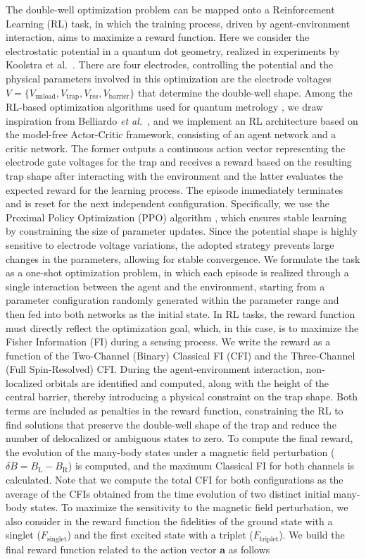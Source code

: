 \documentclass[fleqn,10pt]{wlscirep}
\begin{document}
The double-well optimization problem can be mapped onto a Reinforcement Learning (RL) task, in which the training process, driven by agent-environment interaction, aims to maximize a reward function. Here we consider the electrostatic potential in a quantum dot geometry, realized in experiments by Koolstra et al.~\cite{koolstra2026strong}. There are four electrodes, controlling the potential and the physical parameters involved in this optimization are the electrode voltages $V=\{V_\mathrm{unload}, V_\mathrm{trap}, V_\mathrm{res}, V_\mathrm{barrier}\}$ that determine the double-well shape. Among the RL-based optimization algorithms used for quantum metrology \cite{bukov2026reinforcement}, we draw inspiration from  Belliardo \textit{et al.}~\cite{belliardo2024model}, and we implement an RL architecture based on the model-free Actor-Critic framework, consisting of an agent network and a critic network.  The former outputs a continuous action vector representing the electrode gate voltages for the trap and receives a reward based on the resulting trap shape after interacting with the environment and the latter evaluates the expected reward for the learning process. The episode immediately terminates and is reset for the next independent configuration. Specifically, we use the Proximal Policy Optimization (PPO) algorithm \cite{schulman2017proximal}, which ensures stable learning by constraining the size of parameter updates. Since the potential shape is highly sensitive to electrode voltage variations, the adopted strategy prevents large changes in the parameters, allowing for stable convergence. We formulate the task as a one-shot optimization problem, in which each episode is realized through a single interaction between the agent and the environment, starting from a parameter configuration randomly generated within the parameter range and then fed into both networks as the initial state.
In RL tasks, the reward function must directly reflect the optimization goal, which, in this case, is to maximize the Fisher Information (FI) during a sensing process. We write the reward as a function of the Two-Channel (Binary) Classical FI (CFI) and the Three-Channel (Full Spin-Resolved) CFI. During the agent-environment interaction, non-localized orbitals are identified and computed, along with the height of the central barrier, thereby introducing a physical constraint on the trap shape. Both terms are included as penalties in the reward function, constraining the RL to find solutions that preserve the double-well shape of the trap and reduce the number of delocalized or ambiguous states to zero. To compute the final reward, the evolution of the many-body states under a magnetic field perturbation ($\delta B= B_\mathrm{L} - B_\mathrm{R}$) is computed, and the maximum Classical FI for both channels is calculated. Note that we compute the total CFI for both configurations as the average of the CFIs obtained from the time evolution of two distinct initial many-body states. To maximize the sensitivity to the magnetic field perturbation, we also consider in the reward function the fidelities of the ground state with a singlet ($ F_{\mathrm{singlet}}$) and the first excited state with a triplet ($F_{\mathrm{triplet}}$). We build the final reward function related to the action vector $\mathbf{a}$  as follows
\end{document}
